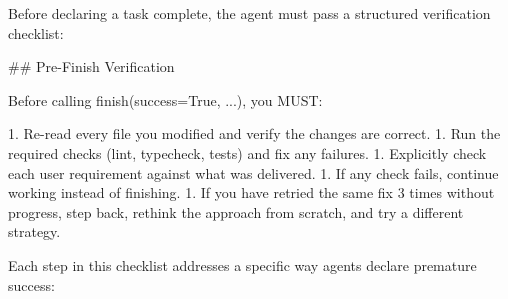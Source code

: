 \documentclass{article}
\begin{document}
Before declaring a task complete, the agent must pass a structured
verification checklist:

\begin{prompt}
## Pre-Finish Verification

Before calling finish(success=True, ...), you MUST:

1. Re-read every file you modified and verify the changes
   are correct.
1. Run the required checks (lint, typecheck, tests) and
   fix any failures.
1. Explicitly check each user requirement against what was
   delivered.
1. If any check fails, continue working instead of
   finishing.
1. If you have retried the same fix 3 times without
   progress, step back, rethink the approach from scratch,
   and try a different strategy.
\end{prompt}

\noindent Each step in this checklist addresses a specific way agents
declare premature success:
\end{document}
